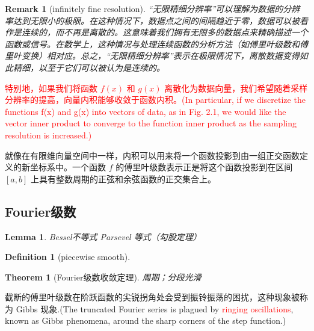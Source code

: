 \documentclass{ctexart}
\newtheorem{theorem}{Theorem}
\newtheorem{definition}{Definition}
\newtheorem*{remark}{Remark}
\newtheorem{lemma}{Lemma}
\newcommand{\textred}[1]{\textcolor{red}{#1}}
\begin{document}
\vspace{6ex} %

\begin{remark}[infinitely fine resolution]

“无限精细分辨率”可以理解为数据的分辨率达到无限小的极限。在这种情况下，数据点之间的间隔趋近于零，数据可以被看作是连续的，而不再是离散的。这意味着我们拥有无限多的数据点来精确描述一个函数或信号。在数学上，这种情况与处理连续函数的分析方法（如傅里叶级数和傅里叶变换）相对应。总之，“无限精细分辨率”表示在极限情况下，离散数据变得如此精细，以至于它们可以被认为是连续的。

\end{remark}

\vspace{6ex} %

\textcolor{red}{特别地，如果我们将函数 \( f(x) \) 和 \( g(x) \) 离散化为数据向量，我们希望随着采样分辨率的提高，向量内积能够收敛于函数内积。(In particular, if we discretize the functions f(x) and g(x) into vectors of data, as in Fig. 2.1, we would like the vector inner product to converge to the function inner product as the sampling resolution is increased.)}

就像在有限维向量空间中一样，内积可以用来将一个函数投影到由一组正交函数定义的新坐标系中。一个函数 \( f \) 的傅里叶级数表示正是将这个函数投影到在区间 \([a,b]\) 上具有整数周期的正弦和余弦函数的正交集合上。


\subsection{Fourier级数}

\begin{lemma}

Bessel不等式 \quad Parsevel 等式（勾股定理）

\end{lemma}

\begin{definition}[piecewise smooth]

\end{definition}

\begin{theorem}[Fourier级数收敛定理]

周期；分段光滑

\end{theorem}

截断的傅里叶级数在阶跃函数的尖锐拐角处会受到振铃振荡的困扰，这种现象被称为 Gibbs 现象.(The truncated Fourier series is plagued by \textred{ringing oscillations}, known as Gibbs phenomena, around the sharp corners of the step function.)
\end{document}
